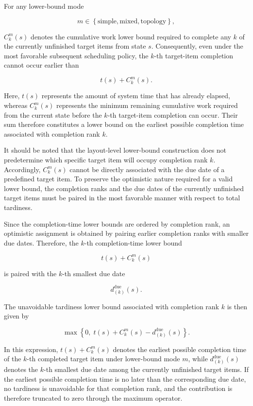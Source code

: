 For any lower-bound mode

\[
m
\in
\left\{
\mathrm{simple},
\mathrm{mixed},
\mathrm{topology}
\right\},
\]

\(C_k^m(s)\) denotes the cumulative work lower bound required to complete any
\(k\) of the currently unfinished target items from state \(s\). Consequently,
even under the most favorable subsequent scheduling policy, the \(k\)-th
target-item completion cannot occur earlier than

\[
t(s)
+
C_k^m(s).
\]

Here, \(t(s)\) represents the amount of system time that has already elapsed,
whereas \(C_k^m(s)\) represents the minimum remaining cumulative work required
from the current state before the \(k\)-th target-item completion can occur.
Their sum therefore constitutes a lower bound on the earliest possible
completion time associated with completion rank \(k\).

It should be noted that the layout-level lower-bound construction does not
predetermine which specific target item will occupy completion rank \(k\).
Accordingly, \(C_k^m(s)\) cannot be directly associated with the due date of a
predefined target item. To preserve the optimistic nature required for a valid
lower bound, the completion ranks and the due dates of the currently unfinished
target items must be paired in the most favorable manner with respect to total
tardiness.

Since the completion-time lower bounds are ordered by completion rank, an
optimistic assignment is obtained by pairing earlier completion ranks with
smaller due dates. Therefore, the \(k\)-th completion-time lower bound

\[
t(s)
+
C_k^m(s)
\]

is paired with the \(k\)-th smallest due date

\[
d_{(k)}^{\mathrm{due}}(s).
\]

The unavoidable tardiness lower bound associated with completion rank \(k\) is
then given by

\[
\max
\left\{
0,\;
t(s)
+
C_k^m(s)
-
d_{(k)}^{\mathrm{due}}(s)
\right\}.
\]

In this expression, \(t(s)+C_k^m(s)\) denotes the earliest possible completion
time of the \(k\)-th completed target item under lower-bound mode \(m\), while
\(d_{(k)}^{\mathrm{due}}(s)\) denotes the \(k\)-th smallest due date among the
currently unfinished target items. If the earliest possible completion time is
no later than the corresponding due date, no tardiness is unavoidable for that
completion rank, and the contribution is therefore truncated to zero through
the maximum operator.

